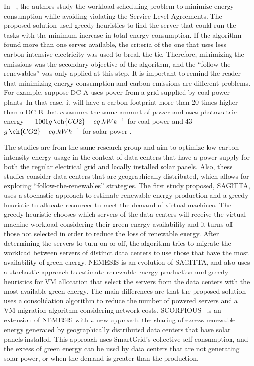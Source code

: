 In ~\citet{KHODAYARSERESHT2023_energycarbonaware_vm}, the authors study the workload scheduling problem to minimize energy consumption while avoiding violating the Service Level Agreements. The proposed solution used greedy heuristics to find the server that could run the tasks with the minimum increase in total energy consumption. If the algorithm found more than one server available, the criteria of the one that uses less carbon-intensive electricity was used to break the tie. Therefore, minimizing the emissions was the secondary objective of the algorithm, and the ``follow-the-renewables'' was only applied at this step. It is important to remind the reader that minimizing energy consumption and carbon emissions are different problems. For example, suppose DC A uses power from a grid supplied by coal power plants. In that case, it will have a carbon footprint more than 20 times higher than a DC B that consumes the same amount of power and uses photovoltaic energy ---  $1001 g\,\ch{CO2}-eq.kWh^{-1}$ for coal power and 43  $g\,\ch{CO2}-eq.kWh^{-1}$ for solar power \cite{nrel_lifecycle_2021}. 


The studies \citet{SAGITTA,NEMESIS,SCORPIOUS} are from the same research group and aim to optimize low-carbon intensity energy usage in the context of data centers that have a power supply for both the regular electrical grid and locally installed solar panels. Also, these studies consider data centers that are geographically distributed, which allows for exploring ``follow-the-renewables'' strategies. The first study proposed, SAGITTA\citep{SAGITTA}, uses a stochastic approach to estimate renewable energy production and a greedy heuristic to allocate resources to meet the demand of virtual machines. The greedy heuristic chooses which servers of the data centers will receive the virtual machine workload considering their green energy availability and it turns off those not selected in order to reduce the loss of renewable energy. After determining the servers to turn on or off, the algorithm tries to migrate the workload between servers of distinct data centers to use those that have the most availability of green energy. NEMESIS\citep{NEMESIS} is an evolution of SAGITTA, and also uses a stochastic approach to estimate renewable energy production and greedy heuristics for VM allocation that select the servers from the data centers with the most available green energy. The main differences are that the proposed solution uses a consolidation algorithm to reduce the number of powered servers and a VM migration algorithm considering network costs. SCORPIOUS~\citep{SCORPIOUS} is an extension of NEMESIS  with a new approach: the sharing of excess renewable energy generated by geographically distributed data centers that have solar panels installed. This approach uses SmartGrid's collective self-consumption, and the excess of green energy can be used by data centers that are not generating solar power, or when the demand is greater than the production.


